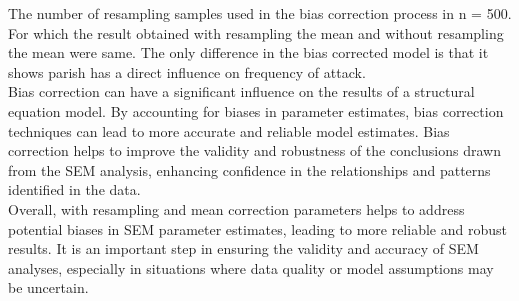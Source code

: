 \documentclass[10pt, conference, compsocconf]{IEEEtran}
\begin{document}
The number of resampling samples used in the bias correction process in n = 500.\\
For which the result obtained with resampling the mean and without resampling the mean were same.
The only difference in the bias corrected model is that it shows parish has a direct influence on frequency of attack.
\\
Bias correction can have a significant influence on the results of a structural equation model.
By accounting for biases in parameter estimates, bias correction techniques can lead to more accurate and reliable model estimates.
Bias correction helps to improve the validity and robustness of the conclusions drawn from the SEM analysis, enhancing confidence in the relationships and patterns identified in the data.
\\
Overall, with resampling and mean correction parameters helps to address potential biases in SEM parameter estimates, leading to more reliable and robust results. It is an important step in ensuring the validity and accuracy of SEM analyses, especially in situations where data quality or model assumptions may be uncertain.
\end{document}
